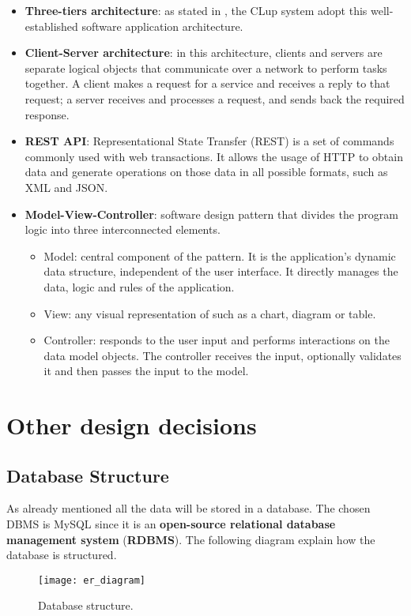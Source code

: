 \begin{itemize}
	\item \textbf{Three-tiers architecture}: as stated in , the CLup system adopt this well-established software application architecture.
	
	\item \textbf{Client-Server architecture}: in this architecture, clients and servers are separate logical objects that communicate over a network to perform tasks together. A client makes a request for a service and receives a reply to that request; a server receives and processes a request, and sends back the required response.
	
	\item \textbf{REST API}: Representational State Transfer (REST) is a set of commands commonly used with web transactions. It allows the usage of HTTP to obtain data and generate operations on those data in all possible formats, such as XML and JSON.
	
	\item \textbf{Model-View-Controller}: software design pattern that divides the program logic into three interconnected elements.
	\begin{itemize}
		\item Model: central component of the pattern. It is the application's dynamic data structure, independent of the user interface. It directly manages the data, logic and rules of the application.
		\item View: any visual representation of  such as a chart, diagram or table.
		\item Controller: responds to the user input and performs interactions on the data model objects. The controller receives the input, optionally validates it and then passes the input to the model.
	\end{itemize}
\end{itemize}

\clearpage

\section{Other design decisions}
\subsection{Database Structure}
As already mentioned all the data will be stored in a database. The chosen DBMS is MySQL since it is an \textbf{open-source relational database management system} (\textbf{RDBMS}).\newline
The following diagram explain how the database is structured.
\begin{figure}[H]
	\centering
	\texttt{[image: er\_diagram]}
	\caption{Database structure.}
	\label{fig:er_diagram}
\end{figure}

